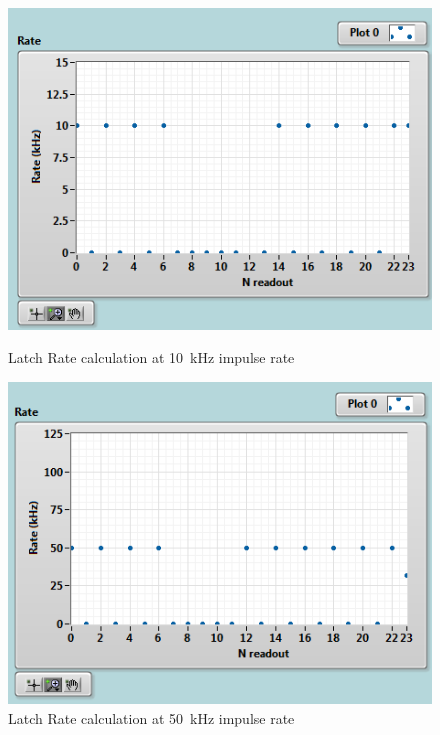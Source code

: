 \begin{figure}[H]
	\centering
	\begin{minipage}{0.49\textwidth}
		\centering
		\includegraphics[width=.95\linewidth]{IMG/ch5/latch_tests/fig3.PNG}
		\caption{Latch Rate calculation at 10~kHz impulse rate}
		\label{fig:latchrate10}
	\end{minipage}%
	\begin{minipage}{0.49\textwidth}
		\centering
		\includegraphics[width=.95\linewidth]{IMG/ch5/latch_tests/fig5.PNG}
		\caption{Latch Rate calculation at 50~kHz impulse rate}
		\label{fig:latchrate50}
	\end{minipage}
\end{figure}
